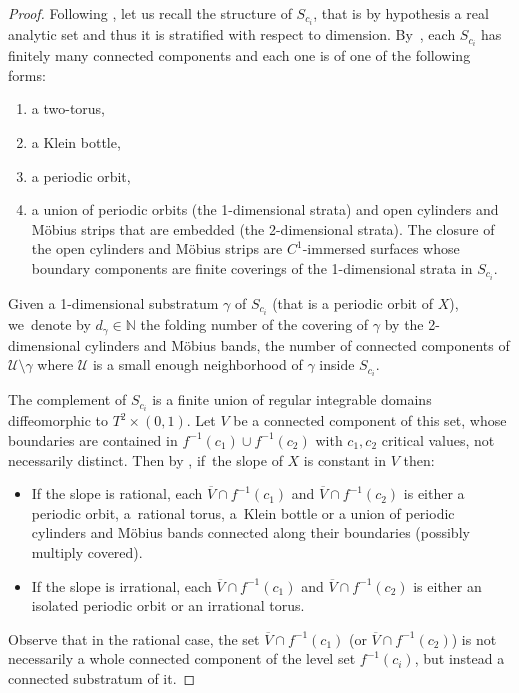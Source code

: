 \begin{proof}
Following \cite{CV2}, let us recall the structure of $S_{c_i}$, that is by hypothesis a real analytic set and thus it is stratified with respect to dimension. By~\cite[Prop.\,2.6]{CV2}, each $S_{c_i}$ has finitely many connected components and each one is of one of the following forms:
\begin{enumerate}
\item a two-torus,
\item a Klein bottle,
\item a periodic orbit,
\item a union of periodic orbits (the 1-dimensional strata) and open cylinders and Möbius strips that are embedded (the 2-dimensional strata). The closure of the open cylinders and Möbius strips are $C^1$-immersed surfaces whose boundary components are finite coverings of the 1-dimensional strata in $S_{c_i}$.
\end{enumerate}
Given a 1-dimensional substratum $\gamma$ of $S_{c_i}$ (that is a periodic orbit of $X$), we~denote by $d_{\gamma}\in \mathbb{N}$ the folding number of the covering of $\gamma$ by the 2-dimensional cylinders and Möbius bands, \ie the number of connected components of $\mathcal{U}\setminus \gamma$ where $\mathcal{U}$ is a small enough neighborhood of $\gamma$ inside $S_{c_i}$.

The complement of $S_{c_i}$ is a finite union of regular integrable domains diffeomorphic to $T^2\times (0,1)$. Let $V$ be a connected component of this set, whose boundaries are contained in $f^{-1}(c_1)\cup f^{-1}(c_2)$ with $c_1,c_2$ critical values, not necessarily distinct. Then by \cite[Lem.\,3.4]{CV2}, if~the slope of $X$ is constant in $V$ then:
\begin{itemize}
\item
If the slope is rational, each $\overline{V}\cap f^{-1}(c_1)$ and $\overline{V}\cap f^{-1}(c_2)$ is either a periodic orbit, a~rational torus, a~Klein bottle or a union of periodic cylinders and Möbius bands connected along their boundaries (possibly multiply covered).
\item
If the slope is irrational, each $\overline{V}\cap f^{-1}(c_1)$ and $\overline{V}\cap f^{-1}(c_2)$ is either an isolated periodic orbit or an irrational torus.
\end{itemize}
Observe that in the rational case, the set $\overline{V}\cap f^{-1}(c_1)$ (or $\overline{V}\cap f^{-1}(c_2)$) is not necessarily a whole connected component of the level set $f^{-1}(c_i)$, but instead a connected substratum of it.


\end{proof}
